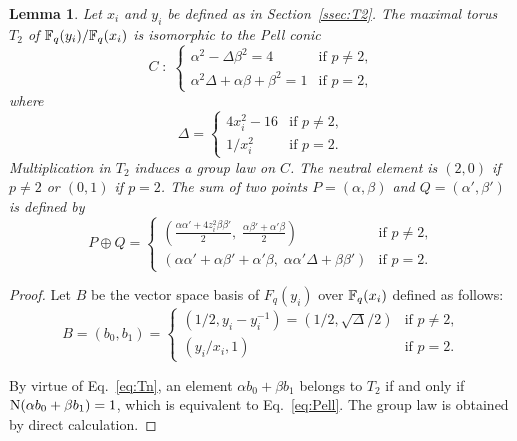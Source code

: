 \documentclass{sig-alternate}
\newtheorem{lemma}[definition]{Lemma}
\begin{document}
\begin{lemma}
  Let $x_i$ and $y_i$ be defined as in Section~\ref{ssec:T2}. The
  maximal torus $T_2$ of $\mathbb{F}_q(y_i)/\mathbb{F}_q(x_i)$ is isomorphic to the
  \emph{Pell conic}
  \begin{equation}
    \label{eq:Pell}
    C \;:\; 
    \begin{cases}
      \alpha^2 - \Delta\beta^2 = 4 &\text{if $p\ne2$,}\\
      \alpha^2\Delta + \alpha\beta + \beta^2 = 1 &\text{if $p=2$,}
    \end{cases}
  \end{equation}
  where
  \begin{equation}
    \Delta =
    \begin{cases}
      4x_i^2-16 & \text{if $p\ne 2$,}\\
      1/x_i^2   & \text{if $p=2$.}
    \end{cases}
  \end{equation}
  Multiplication in $T_2$ induces a group law on $C$. The neutral
  element is $(2,0)$ if $p\ne2$ or $(0,1)$ if $p=2$. The sum of two
  points $P=(\alpha,\beta)$ and $Q=(\alpha',\beta')$ is defined
  by
  \begin{equation}
    \label{eq:Pell-add}
    P\oplus Q =
    \begin{cases}
      \left(\frac{\alpha\alpha' + 4z_i^2\beta\beta'}{2},\; \frac{\alpha\beta' + \alpha'\beta}{2}\right) &
      \text{if $p\ne2$,}\\
      \left(\alpha\alpha' + \alpha\beta' + \alpha'\beta,\; \alpha\alpha'\Delta + \beta\beta'\right) &
      \text{if $p=2$.}
    \end{cases}
  \end{equation}
\end{lemma}
\begin{proof}
  Let $B$ be the vector space basis of $F_q(y_i)$ over $\mathbb{F}_q(x_i)$
  defined as follows:
  \begin{equation*}
    B = (b_0, b_1) =
    \begin{cases}
      (1/2, y_i - y_i^{-1}) = (1/2, \sqrt{\Delta}/2) & \text{if $p\ne2$,}\\
      (y_i/x_i, 1) & \text{if $p=2$.}
    \end{cases}
  \end{equation*}
  
  By virtue of Eq.~\eqref{eq:Tn}, an element $\alpha b_0 + \beta b_1$
  belongs to $T_2$ if and only if $\operatorname{N}(\alpha b_0+\beta b_1)=1$,
  which is equivalent to Eq.~\eqref{eq:Pell}.  The group law is
  obtained by direct calculation.
\end{proof}
\end{document}
